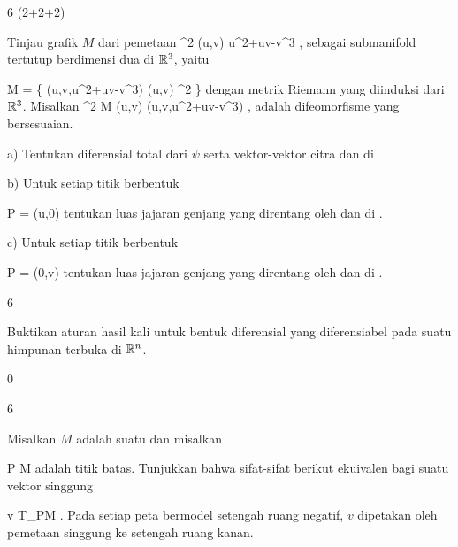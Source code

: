{6 (2+2+2)}
{

Tinjau grafik $M$ dari pemetaan
\maabbeledisp {\varphi} {\R^2} {\R
} {(u,v)} { u^2+uv-v^3
} {,}
sebagai submanifold tertutup berdimensi dua di ${\mathbb R}^3$, yaitu

\mavergleichskettedisp
{\vergleichskette
{ M
}
{ =} { \left\{ (u,v,u^2+uv-v^3)  \mid  (u,v) \in \R^2         \right\}
}
{ } {
}
{ } {
}
{ } {
}
}
{}{}{}
dengan metrik Riemann yang diinduksi dari ${\mathbb R}^3$. Misalkan
\maabbeledisp {\psi} {\R^2} { M
} {(u,v)} { (u,v,u^2+uv-v^3)
} {,}
adalah difeomorfisme yang bersesuaian.

a) Tentukan diferensial total dari $\psi$ serta vektor-vektor citra
 dan
 di

b) Untuk setiap titik berbentuk

\mavergleichskette
{\vergleichskette
{ P
}
{ = }{ (u,0)
}
{  }{
}
{    }{
}
{   }{
}
}
{}{}{}
tentukan luas jajaran genjang yang direntang oleh
 dan
 di
.

c) Untuk setiap titik berbentuk

\mavergleichskette
{\vergleichskette
{ P
}
{ = }{ (0,v)
}
{  }{
}
{    }{
}
{   }{
}
}
{}{}{}
tentukan luas jajaran genjang yang direntang oleh
 dan
 di
.

}
{} {}

{6}
{

Buktikan aturan hasil kali untuk bentuk diferensial yang diferensiabel pada suatu himpunan terbuka di ${\mathbb R}^n$.

}
{} {}

{0}
{

}
{} {}

{6}
{

Misalkan $M$ adalah suatu
dan misalkan

\mavergleichskette
{\vergleichskette
{ P
}
{ \in }{ \partial M
}
{  }{
}
{    }{
}
{   }{
}
}
{}{}{}
adalah titik batas. Tunjukkan bahwa sifat-sifat berikut ekuivalen bagi suatu vektor singgung

\mavergleichskette
{\vergleichskette
{ v
}
{ \in }{ T_PM
}
{  }{
}
{    }{
}
{   }{
}
}
{}{}{.}
 { Pada setiap peta bermodel setengah ruang negatif, $v$ dipetakan oleh pemetaan singgung ke setengah ruang kanan.
}

}
{} {}

